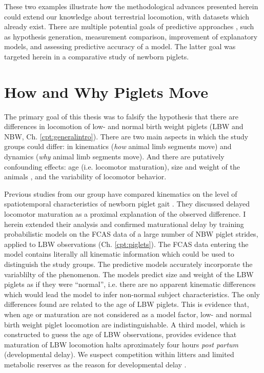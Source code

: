 These two examples illustrate how the methodological advances presented herein could extend our knowledge about terrestrial locomotion, with datasets which already exist.
There are multiple potential goals of predictive approaches \citep{Shmueli2010}, such as hypothesis generation, measurement comparison, improvement of explanatory models, and assessing predictive accuracy of a model.
The latter goal was targeted herein in a comparative study of newborn piglets.


\section{How and Why Piglets Move}
\label{sec:org3673bcf}
The primary goal of this thesis was to falsify the hypothesis that there are differences in locomotion of low- and normal birth weight piglets (LBW and NBW, Ch. \ref{cpt:generalintro}).
There are two main aspects in which the study groups could differ: in kinematics (\emph{how} animal limb segments move) and dynamics (\emph{why} animal limb segments move).
And there are putatively confounding effects: age (i.e. locomotor maturation), size and weight of the animals \citep[i.e. physical appearance, cf.][]{Aerts2023}, and the variability of locomotor behavior.


Previous studies from our group have compared kinematics on the level of spatiotemporal characteristics of newborn piglet gait \citep{VandenHole2017}.
They discussed delayed locomotor maturation as a proximal explanation of the observed difference.
I herein extended their analysis and confirmed maturational delay by training probabilistic models on the FCAS data of a large number of NBW piglet strides, applied to LBW observations (Ch. \ref{cpt:piglets}).
The FCAS data entering the model contains literally all kinematic information which could be used to distinguish the study groups.
The predictive models accurately incorporate the variablilty of the phenomenon.
The models predict size and weight of the LBW piglets as if they were ``normal'', i.e. there are no apparent kinematic differences which would lead the model to infer non-normal subject characteristics.
The only differences found are related to the age of LBW piglets.
This is evidence that, when age or maturation are not considered as a model factor, low- and normal birth weight piglet locomotion are indistinguishable.
A third model, which is constructed to guess the age of LBW observations, provides evidence that maturation of LBW locomotion halts aproximately four hours \emph{post partum} (developmental delay).
We suspect competition within litters and limited metabolic reserves as the reason for developmental delay \citep{VandenHole2019}.

